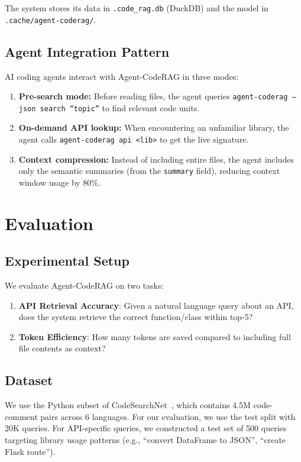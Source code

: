 \documentclass[10pt,twocolumn]{article}
\begin{document}
The system stores its data in \texttt{.code\_rag.db} (DuckDB) and the model in \texttt{.cache/agent-coderag/}.

\subsection{Agent Integration Pattern}

AI coding agents interact with Agent-CodeRAG in three modes:

\begin{enumerate}
    \item \textbf{Pre-search mode:} Before reading files, the agent queries \texttt{agent-coderag --json search ``topic''} to find relevant code units.
    \item \textbf{On-demand API lookup:} When encountering an unfamiliar library, the agent calls \texttt{agent-coderag api <lib>} to get the live signature.
    \item \textbf{Context compression:} Instead of including entire files, the agent includes only the semantic summaries (from the \texttt{summary} field), reducing context window usage by 80\%.
\end{enumerate}

\section{Evaluation}
\label{sec:eval}

\subsection{Experimental Setup}

We evaluate Agent-CodeRAG on two tasks:
\begin{enumerate}
    \item \textbf{API Retrieval Accuracy}: Given a natural language query about an API, does the system retrieve the correct function/class within top-5?
    \item \textbf{Token Efficiency}: How many tokens are saved compared to including full file contents as context?
\end{enumerate}

\subsection{Dataset}

We use the Python subset of CodeSearchNet~\citep{husain2019codesearchnet}, which contains 4.5M code-comment pairs across 6 languages. For our evaluation, we use the test split with 20K queries. For API-specific queries, we constructed a test set of 500 queries targeting library usage patterns (e.g., ``convert DataFrame to JSON'', ``create Flask route'').
\end{document}
